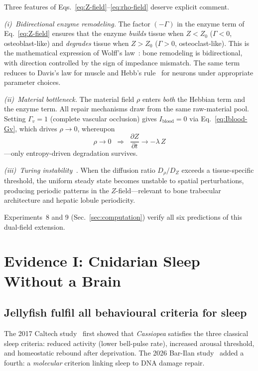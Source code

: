 ﻿\documentclass[aps,pre,twocolumn,superscriptaddress,floatfix]{revtex4-2}
\begin{document}
Three features of Eqs.~\eqref{eq:Z-field}--\eqref{eq:rho-field}
deserve explicit comment.

\emph{(i)~Bidirectional enzyme remodeling.}
The factor $(-\Gamma)$ in the enzyme term of Eq.~\eqref{eq:Z-field}
ensures that the enzyme \emph{builds} tissue when $Z < Z_0$
($\Gamma < 0$, osteoblast-like) and \emph{degrades} tissue
when $Z > Z_0$ ($\Gamma > 0$, osteoclast-like).
This is the mathematical expression of Wolff's law~\cite{Wolff1892}:
bone remodeling is bidirectional, with direction
controlled by the sign of impedance mismatch.
The same term reduces to Davis's law for muscle
and Hebb's rule~\cite{Hebb1949} for neurons
under appropriate parameter choices.

\emph{(ii)~Material bottleneck.}
The material field $\rho$ enters \emph{both} the Hebbian
term and the enzyme term.
All repair mechanisms draw from the same raw-material pool.
Setting $\Gamma_v = 1$ (complete vascular occlusion)
gives $I_{\mathrm{blood}} = 0$ via Eq.~\eqref{eq:Iblood-Gv},
which drives $\rho \to 0$, whereupon
\begin{equation}
  \rho \to 0 \;\;\Longrightarrow\;\;
  \frac{\partial Z}{\partial t} \to -\lambda\,Z
  \label{eq:ischemia-limit}
\end{equation}
---only entropy-driven degradation survives.

\emph{(iii)~Turing instability~\cite{Turing1952}.}
When the diffusion ratio $D_\rho / D_Z$ exceeds a
tissue-specific threshold, the uniform steady state becomes
unstable to spatial perturbations, producing periodic patterns
in the $Z$-field---relevant to bone trabecular architecture
and hepatic lobule periodicity.

Experiments~8 and 9 (Sec.~\ref{sec:computation})
verify all six predictions of this dual-field extension.


\section{Evidence I: Cnidarian Sleep Without a Brain}
\label{sec:cnidaria}

\subsection{Jellyfish fulfil all behavioural criteria for sleep}

The 2017 Caltech study~\cite{Nath2017} first showed that
\textit{Cassiopea} satisfies the three classical sleep criteria:
reduced activity (lower bell-pulse rate),
increased arousal threshold,
and homeostatic rebound after deprivation.
The 2026 Bar-Ilan study~\cite{Appelbaum2026} added a fourth:
a \emph{molecular} criterion linking sleep to DNA damage repair.
\end{document}
